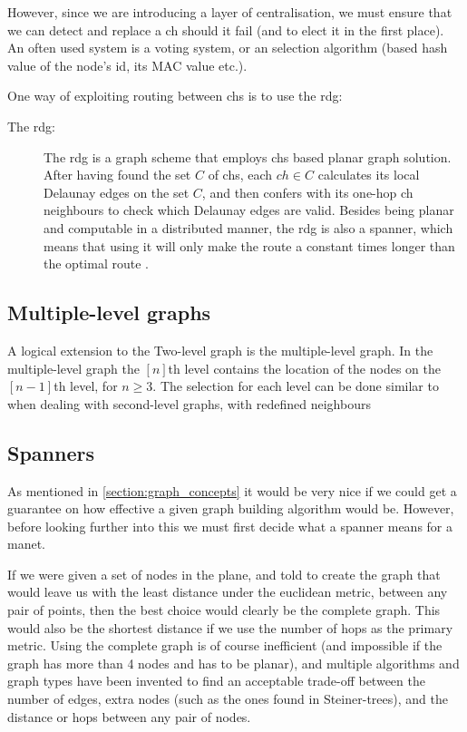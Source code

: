 However, since we are introducing a layer of centralisation, we must ensure that we can detect and replace a \ac{ch} should it fail (and to elect it in the first place). An often used system is a voting system, or an selection algorithm (based hash value of the node's id, its MAC value etc.).

One way of exploiting routing between \acp{ch} is to use the \ac{rdg}:
\begin{description}
\item[The \ac{rdg}:] The \ac{rdg} is a graph scheme that employs \acp{ch} based planar graph solution. After having found the set $C$ of \acp{ch}, each $ch \in C$ calculates its local Delaunay edges on the set $C$, and then confers with its one-hop \ac{ch} neighbours to check which Delaunay edges are valid. Besides being planar and computable in a distributed manner, the \ac{rdg} is also a spanner, which means that using it will only make the route a constant times longer than the optimal route \cite{GeoSpanners}.
\end{description}

\subsection{Multiple-level graphs}
A logical extension to the Two-level graph is the multiple-level graph. In the multiple-level graph the $[n]$th level contains the location of the nodes on the $[n-1]$th level, for $n \geq 3$. The selection for each level can be done similar to when dealing with second-level graphs, with redefined neighbours    

\subsection{Spanners}
\label{section:spanners}
As mentioned in \ref{section:graph_concepts} it would be very nice if we could get a guarantee on how effective a given graph building algorithm would be. However, before looking further into this we must first decide what a spanner means for a \ac{manet}.

If we were given a set of nodes in the plane, and told to create the graph that would leave us with the least distance under the euclidean metric, between any pair of points, then the best choice would clearly be the complete graph. This would also be the shortest distance if we use the number of hops as the primary metric. Using the complete graph is of course inefficient (and impossible if the graph has more than 4 nodes and has to be planar), and multiple algorithms and graph types have been invented to find an acceptable trade-off between the number of edges, extra nodes (such as the ones found in Steiner-trees), and the distance or hops between any pair of nodes.

